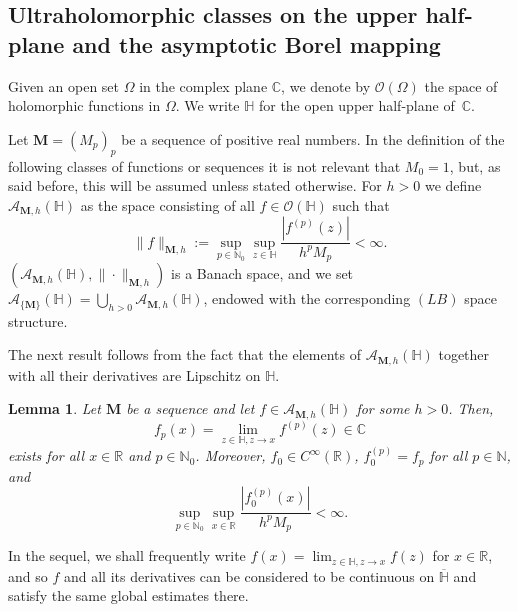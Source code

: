 \documentclass[12pt,a4paper]{article}
\newcommand{\N}{\mathbb{N}}
\newcommand{\R}{\mathbb{R}}
\newcommand{\C}{\mathbb{C}}
\newcommand{\HH}{\mathbb{H}}
\newcommand{\M}{{\boldsymbol{M}}}
\theoremstyle{plain}
\newtheorem{lemma}[theorem]{Lemma}
\theoremstyle{definition}
\numberwithin{equation}{section}
\begin{document}
\subsection{Ultraholomorphic classes on the upper half-plane and the asymptotic Borel mapping}\label{subsect-ultraholom-dm}

Given an open set $\Omega$ in the complex plane $\C$, we denote by
$\mathcal{O}(\Omega)$ the space of holomorphic functions in $\Omega$. We write $\HH$ for the open upper half-plane of~$\C$.

Let $\M=(M_p)_p$ be a sequence of positive real numbers. In the definition of the following classes of functions or sequences it is not relevant that $M_0=1$, but, as said before, this will be assumed unless stated otherwise. For $h>0$
we define $\mathcal{A}_{\M,h}(\HH)$ as the space consisting of all $f \in \mathcal{O}(\HH)$ such that
$$
\|f\|_{\M,h}:=\sup_{p \in \N_0} \sup_{z \in \HH} \frac{|f^{(p)}(z)|}{h^pM_p} < \infty.
$$
$(\mathcal{A}_{\M,h}(\HH),\|\cdot\|_{\M,h})$ is a Banach space, and we set $\mathcal{A}_{\{\M\}}(\HH) = \bigcup_{h>0} \mathcal{A}_{\M,h}(\HH)$, endowed with the corresponding $(LB)$ space structure.

The next result follows from the fact that the elements of $\mathcal{A}_{\M,h}(\HH)$ together with all their derivatives are Lipschitz on $\HH$.

\begin{lemma}\label{extension-dm}
Let $\M$ be a sequence and let $f \in \mathcal{A}_{\M,h}(\HH)$ for some $h > 0$. Then,
\begin{equation*}
f_p(x) = \lim_{z \in \HH, z \to x} f^{(p)}(z)  \in \C
\end{equation*}
exists for all $x \in \R$ and $p \in \N_0$. Moreover, $f_0 \in C^\infty(\R)$, $f_0^{(p)} = f_p$ for all $p \in \N$, and
$$
\sup_{p \in \N_0} \sup_{x \in \R} \frac{|f_0^{(p)}(x)|}{h^pM_p} < \infty.
$$
\end{lemma}

In the sequel, we shall frequently write $f(x) = \lim_{z \in \HH, z \to x} f(z)$ for $x \in \R$, and so $f$ and all its derivatives can be considered to be continuous on $\overline{\HH}$ and satisfy the same global estimates there.
\end{document}
